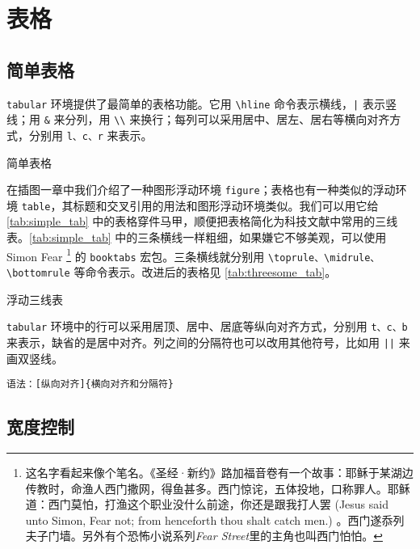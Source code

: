 \chapter{表格}

\section{简单表格}

\texttt{tabular} 环境提供了最简单的表格功能。它用 \verb|\hline| 命令表示横线，\verb+|+ 表示竖线；用 \verb|&| 来分列，用 \verb|\\| 来换行；每列可以采用居中、居左、居右等横向对齐方式，分别用 \texttt{l、c、r} 来表示。

\begin{example}[h]
\caption{简单表格}
\label{tab:simple_tab}
\end{example}


在插图一章中我们介绍了一种图形浮动环境 \texttt{figure}；表格也有一种类似的浮动环境 \texttt{table}，其标题和交叉引用的用法和图形浮动环境类似。我们可以用它给 \autoref{tab:simple_tab} 中的表格穿件马甲，顺便把表格简化为科技文献中常用的三线表。\autoref{tab:simple_tab} 中的三条横线一样粗细，如果嫌它不够美观，可以使用 Simon Fear\indexFear{} \footnote{这名字看起来像个笔名。《圣经·新约》路加福音卷有一个故事：耶稣于某湖边传教时，命渔人西门撒网，得鱼甚多。西门惊诧，五体投地，口称罪人。耶稣道：西门莫怕，打渔这个职业没什么前途，你还是跟我打人罢 (Jesus said unto Simon, Fear not; from henceforth thou shalt catch men.) 。西门遂忝列夫子门墙。另外有个恐怖小说系列\emph{Fear Street}里的主角也叫西门怕怕。} 的 \texttt{booktabs} 宏包\citep{Fear_2005}。三条横线就分别用 \verb|\toprule、\midrule、\bottomrule| 等命令表示。改进后的表格见 \autoref{tab:threesome_tab}。

\begin{example}[h]
\caption{浮动三线表}
\label{tab:threesome_tab}
\end{example}

\texttt{tabular} 环境中的行可以采用居顶、居中、居底等纵向对齐方式，分别用 \texttt{t、c、b} 来表示，缺省的是居中对齐。列之间的分隔符也可以改用其他符号，比如用 \verb+||+ 来画双竖线。

\verb|语法：[纵向对齐]{横向对齐和分隔符}|

\section{宽度控制}

